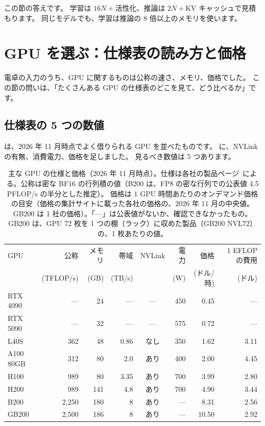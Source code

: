 この節の答えです。
学習は $16N+{}$活性化、推論は $2N+{}$KV キャッシュで見積もります。
同じモデルでも、学習は推論の 8 倍以上のメモリを使います。

\section{GPU を選ぶ：仕様表の読み方と価格}\label{sec:infra-gpu}

電卓の入力のうち、GPU に関するものは公称の速さ、メモリ、価格でした。
この節の問いは、「たくさんある GPU の仕様表のどこを見て、どう比べるか」です。

\subsection*{仕様表の 5 つの数値}

は、2026 年 11 月時点でよく借りられる GPU を並べたものです。
に、NVLink の有無、消費電力、価格を足しました。
見るべき数値は 5 つあります。

\begin{table}[tbp]
\centering
\caption{主な GPU の仕様と価格（2026 年 11 月時点）。仕様は各社の製品ページ~\cite{nvidia2026h100,nvidia2026h200,nvidia2026l40s,nvidia2026rtx5090,nvidia2026gb200}による。公称は密な BF16 の行列積の値（B200 は、FP8 の密な行列での公表値 4.5 PFLOP/s の半分とした推定）。
価格は 1 GPU 時間あたりのオンデマンド価格の目安（価格の集計サイトに載った各社の価格の、2026 年 11 月の中央値。GB200 は 1 社の価格）。「---」は公表値がないか、確認できなかったもの。
GB200 は、GPU 72 枚を 1 つの棚（ラック）に収めた製品（GB200 NVL72）の、1 枚あたりの値。}
\label{tab:infra-gpus}
\footnotesize\setlength{\tabcolsep}{5pt}
\begin{tabular}{lrrrcrrr}
\toprule
GPU & 公称 & メモリ & 帯域 & NVLink & 電力 & 価格 & 1 EFLOP の費用 \\
 & (TFLOP/s) & (GB) & (TB/s) & & (W) & (ドル/時) & (ドル) \\
\midrule
RTX 4090 & --- & 24 & --- & --- & 450 & 0.45 & --- \\
RTX 5090 & --- & 32 & --- & --- & 575 & 0.72 & --- \\
L40S & 362 & 48 & 0.86 & なし & 350 & 1.62 & 3.11 \\
A100 80GB & 312 & 80 & 2.0 & あり & 400 & 2.00 & 4.45 \\
H100 & 989 & 80 & 3.35 & あり & 700 & 3.99 & 2.80 \\
H200 & 989 & 141 & 4.8 & あり & 700 & 4.90 & 3.44 \\
B200 & 2,250 & 180 & 8 & あり & --- & 8.31 & 2.56 \\
GB200 & 2,500 & 186 & 8 & あり & --- & 10.50 & 2.92 \\
\bottomrule
\end{tabular}
\end{table}


